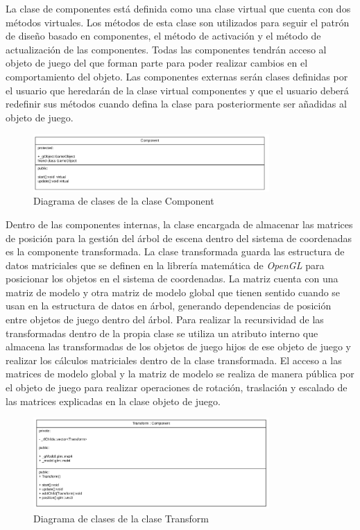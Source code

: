 \documentclass[a4paper]{book}
\begin{document}
La clase de componentes está definida como una clase virtual que cuenta con dos métodos virtuales. Los métodos de esta clase son utilizados
para seguir el patrón de diseño basado en componentes, el método de activación y el método de actualización de las componentes. Todas
las componentes tendrán acceso al objeto de juego del que forman parte para poder realizar cambios en el comportamiento del objeto. Las
componentes externas serán clases definidas por el usuario que heredarán de la clase virtual componentes y que el usuario deberá
redefinir sus métodos cuando defina la clase para posteriormente ser añadidas al objeto de juego.

\begin{figure}[H]
    \centering
    \includegraphics[width=9cm, keepaspectratio]{img/Component.png}
    \caption{Diagrama de clases de la clase Component}
    \label{Component}
\end{figure}

Dentro de las componentes internas, la clase encargada de almacenar las matrices de posición para la gestión del árbol de escena dentro
del sistema de coordenadas es la componente transformada. La clase transformada guarda las estructura de datos matriciales que se definen
en la librería matemática de \textit{OpenGL} para posicionar los objetos en el sistema de coordenadas. La matriz cuenta con una matriz
de modelo y otra matriz de modelo global que tienen sentido cuando se usan en la estructura de datos en árbol, generando dependencias de
posición entre objetos de juego dentro del árbol. Para realizar la recursividad de las transformadas dentro de la propia clase se utiliza
un atributo interno que almacena las transformadas de los objetos de juego hijos de ese objeto de juego y realizar los cálculos matriciales
dentro de la clase transformada. El acceso a las matrices de modelo global y la matriz de modelo se realiza de manera pública por el objeto
de juego para realizar operaciones de rotación, traslación y escalado de las matrices explicadas en la clase objeto de juego.

\begin{figure}[H]
    \centering
    \includegraphics[width=9cm, keepaspectratio]{img/Transform.png}
    \caption{Diagrama de clases de la clase Transform}
    \label{Transform}
\end{figure}
\end{document}
